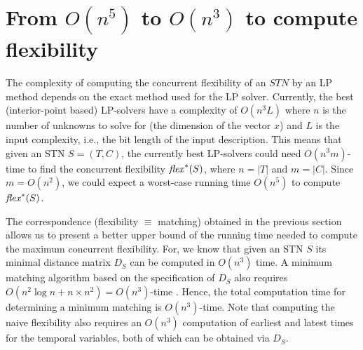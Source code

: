 
\section{From $O(n^5)$ to $O(n^3)$ to compute  flexibility}

The complexity of computing the concurrent flexibility of an $STN$ by an LP method depends on the exact method used for the LP solver. Currently, the best (interior-point based) LP-solvers have a complexity of $O(n^3 L)$ \cite{potra2000} where $n$ is the number of unknowns to solve for (the dimension of the vector $x$) and $L$ is the input complexity, i.e., the bit length of the input description. This means that given an STN $S = (T, C)$, the currently best LP-solvers could need $O(n^3 m)$-time to find the concurrent flexibility $\mathit{flex}^*(S)$, where $n = |T|$ and $m = |C|$. Since $m = O(n^2)$, we could expect a worst-case running time $O(n^5)$ to compute $\mathit{flex}^*(S)$.

The correspondence (flexibility $\equiv$ matching) obtained in the previous section allows us to present a better upper bound of the running time needed to compute the maximum concurrent flexibility.
For, we know that given an STN $S$ its minimal distance matrix $D_S$ can be computed in $O(n^3)$ time. A minimum matching algorithm based on the specification of $D_S$ also requires $O(n^2 \log{n} + n \times n^2) = O(n^3)$-time \cite{Fredman:1987}. Hence, the total computation time for determining a minimum matching is $O(n^3)$-time. 
Note that computing the naive flexibility also requires an $O(n^3)$ computation of earliest and latest times for the temporal variables, both of which can be obtained via $D_S$.

